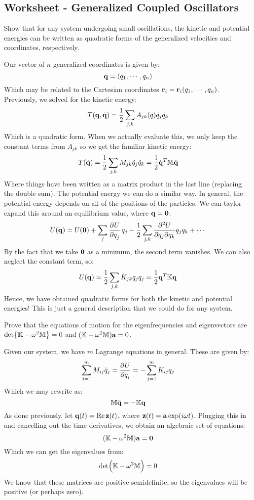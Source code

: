 \documentclass[../PHYS306Notes.tex]{subfiles}
\begin{document}
\subsection{Worksheet - Generalized Coupled Oscillators}
\begin{p}
Show that for any system undergoing small oscillations, the kinetic and potential energies can be written as quadratic forms of the generalized velocities and coordinates, respectively.
\end{p}
\begin{s}
Our vector of $n$ generalized coordinates is given by:
\[\mathbf{q} = (q_1, \cdots, q_n)\]
Which may be related to the Cartesian coordinates $\mathbf{r}_i = \mathbf{r}_i(q_1, \cdots, q_n)$. Previously, we solved for the kinetic energy:
\[T(\mathbf{q}, \dot{\mathbf{q}}) = \frac{1}{2}\sum_{j,k}A_{jk}(q) \dot{q}_j\dot{q}_k\]
Which is a quadratic form. When we actually evaluate this, we only keep the constant terms from $A_{jk}$ so we get the familiar kinetic energy:
\[T(\dot{\mathbf{q}}) = \frac{1}{2}\sum_{j,k}M_{jk}\dot{q}_j\dot{q}_k = \frac{1}{2}\dot{\mathbf{q}}^T\mathbb{M}\dot{\mathbf{q}}\]
Where things have been written as a matrix product in the last line (replacing the double sum). The potential energy we can do a similar way. In general, the potential energy depends on all of the positions of the particles. We can taylor expand this around an equilibrium value, where $\mathbf{q} = \mathbf{0}$:
\[U(\v{q}) = U(\v{0}) + \sum_j \dpd{U}{q_j}q_j + \frac{1}{2}\sum_{j,k}\frac{\partial^2 U}{\partial q_j\partial q_k}q_jq_k + \cdots\]
By the fact that we take $\mathbf{0}$ as a minimum, the second term vanishes. We can also neglect the constant term, so:
\[U(\mathbf{q}) = \frac{1}{2}\sum_{j, k}K_{jk}q_jq_j = \frac{1}{2}\mathbf{q}^T\mathbb{K}\mathbf{q}\]
Hence, we have obtained quadratic forms for both the kinetic and potential energies! This is just a general description that we could do for any system.
\end{s}

\begin{p}
Prove that the equations of motion for the eigenfrequencies and eigenvectors are $\det{\mathbb{K}- \omega^2\mathbb{M}} = 0$ and $(\mathbb{K} - \omega^2\mathbb{M})\mathbf{a} = 0$.
\end{p}
\begin{s}
Given our system, we have $m$ Lagrange equations in general. These are given by:
\[\sum_{j=1}^mM_{ij}\ddot{q}_j = \dpd{U}{q_i} = -\sum_{j=1}^m K_{ij}q_j\]
Which we may rewrite as:
\[\mathbb{M}\ddot{\mathbf{q}} = -\mathbb{K}\mathbf{q}\]
As done previously, let $\mathbf{q}(t) = \Re\mathbf{z}(t)$, where $\mathbf{z}(t) = \mathbf{a}\exp(i\omega t)$. Plugging this in and cancelling out the time derivatives, we obtain an algebraic set of equations:
\[(\mathbb{K} - \omega^2\mathbb{M})\mathbf{a} = \mathbf{0}\]
Which we can get the eigenvalues from:
\[\det(\mathbb{K} - \omega^2\mathbb{M}) = 0\]
We know that these matrices are positive semidefinite, so the eigenvalues will be positive (or perhaps zero).
\end{s}
\end{document}

